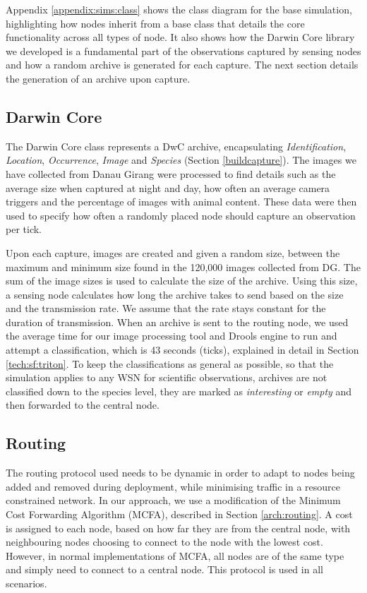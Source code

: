 Appendix \ref{appendix:sims:class} shows the class diagram for the base simulation, highlighting how nodes inherit from a base class that details the core functionality across all types of node. It also shows how the Darwin Core library we developed is a fundamental part of the observations captured by sensing nodes and how a random archive is generated for each capture. The next section details the generation of an archive upon capture.

\subsection{Darwin Core}\label{sims:exp:dwc}
The Darwin Core class represents a DwC archive, encapsulating \textit{Identification}, \textit{Location}, \textit{Occurrence}, \textit{Image} and \textit{Species} (Section \ref{buildcapture}). The images we have collected from Danau Girang were processed to find details such as the average size when captured at night and day, how often an average camera triggers and the percentage of images with animal content. These data were then used to specify how often a randomly placed node should capture an observation per tick.

Upon each capture, images are created and given a random size, between the maximum and minimum size found in the 120,000 images collected from DG. The sum of the image sizes is used to calculate the size of the archive. Using this size, a sensing node calculates how long the archive takes to send based on the size and the transmission rate. We assume that the rate stays constant for the duration of transmission.
When an archive is sent to the routing node, we used the average time for our image processing tool and Drools engine to run and attempt a classification, which is 43 seconds (ticks), explained in detail in Section \ref{tech:sf:triton}. To keep the classifications as general as possible, so that the simulation applies to any WSN for scientific observations, archives are not classified down to the species level, they are marked as \textit{interesting} or \textit{empty} and then forwarded to the central node.

\subsection{Routing}
The routing protocol used needs to be dynamic in order to adapt to nodes being added and removed during deployment, while minimising traffic in a resource constrained network. In our approach, we use a modification of the Minimum Cost Forwarding Algorithm (MCFA), described in Section \ref{arch:routing}. A cost is assigned to each node, based on how far they are from the central node, with neighbouring nodes choosing to connect to the node with the lowest cost. However, in normal implementations of MCFA, all nodes are of the same type and simply need to connect to a central node. This protocol is used in all scenarios.


